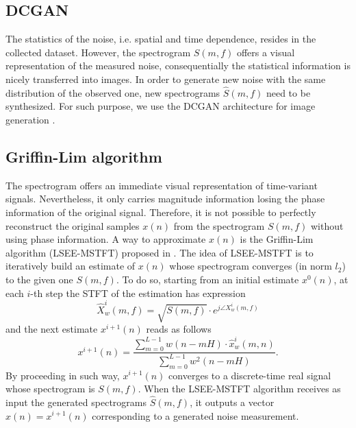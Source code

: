 \subsection{DCGAN}
The statistics of the noise, i.e. spatial and time dependence, resides in the collected dataset. However, the spectrogram $S(m,f)$ offers a visual representation of the measured noise, consequentially  the statistical information is nicely transferred into images. In order to generate new noise with the same distribution of the observed one, new spectrograms $\hat{S}(m,f)$ need to be synthesized. For such purpose, 
we use the DCGAN architecture for image generation \cite{Radford2016}.

\subsection{Griffin-Lim algorithm}
The spectrogram offers an immediate visual representation of time-variant signals. Nevertheless, it only carries magnitude information losing the phase information of the original signal. Therefore, it is not possible to perfectly reconstruct the original samples $x(n)$ from the spectrogram $S(m,f)$ without using phase information. A way to approximate $x(n)$ is the Griffin-Lim algorithm (LSEE-MSTFT) proposed in \cite{GriffinLim}. The idea of LSEE-MSTFT is to iteratively build an estimate of $x(n)$ whose spectrogram converges (in norm $l_2$) to the given one $S(m,f)$. To do so, starting from an initial estimate $x^0(n)$, at each $i$-th step the STFT of the estimation has expression
\begin{equation}
\hat{X}_w^i(m,f)=\sqrt{S(m,f)}\cdot e^{j\angle X_w^i(m,f)}
\end{equation}
and the next estimate $x^{i+1}(n)$ reads as follows
\begin{equation}
x^{i+1}(n)=\frac{\sum_{m=0}^{L-1}{w(n-mH)\cdot \hat{x}_w^i(m,n)}}{\sum_{m=0}^{L-1}{w^2(n-mH)}}.
\end{equation}
By proceeding in such way, $x^{i+1}(n)$ converges to a discrete-time real signal whose spectrogram is $S(m,f)$. When the LSEE-MSTFT algorithm receives as input the generated spectrograms $\hat{S}(m,f)$, it outputs a vector $\hat{x}(n)=x^{i+1}(n)$ corresponding to a generated noise measurement.

